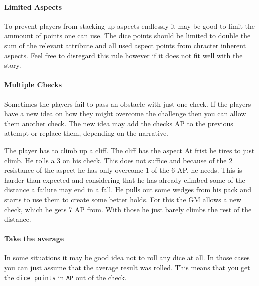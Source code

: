 \documentclass[11pt]{article}
\begin{document}
{\paragraph*{Limited Aspects}
\label{sec:org4360fdd}
To prevent players from stacking up aspects endlessly it may be good to limit the ammount of points one can use. The dice points should be limited to double the sum of the relevant attribute and all used aspect points from chracter inherent aspects. Feel free to disregard this rule however if it does not fit well with the story.
\paragraph*{Multiple Checks}
\label{sec:orgf7661d4}
Sometimes the players fail to pass an obstacle with just one check. If the players have a new idea on how they might overcome the challenge then you can allow them another check. The new idea may add the checks AP to the previous attempt or replace them, depending on the narrative.

\begin{pwexample}
The player has to climb up a cliff. The cliff has the aspect  At frist he tires to just climb. He rolls a 3 on his check. This does not suffice and because of the 2 resistance of the aspect he has only overcome 1 of the 6 AP, he needs. This is harder than expected and considering that he has already climbed some of the distance a failure may end in a fall. He pulls out some wedges from his pack and starts to use them to create some better holds. For this the GM allows a new check, which he gets 7 AP from. With those he just barely climbs the rest of the distance.
\end{pwexample}
\paragraph*{Take the average}
\label{sec:org386b63b}
In some situations it may be good idea not to roll any dice at all. In those cases you can just assume that the average result was rolled. This means that you get the \texttt{dice points} in \texttt{AP} out of the check. 
}
\end{document}
